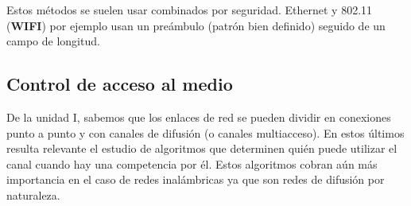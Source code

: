 \documentclass{book}
\begin{document}
	Estos métodos se suelen usar combinados por seguridad. Ethernet y 802.11 (\textbf{WIFI}) por ejemplo usan un preámbulo (patrón bien definido) seguido de un campo de longitud.
	
	\subsection{Control de acceso al medio}
	De la unidad I, sabemos que los enlaces de red se pueden dividir en conexiones punto a punto y con canales de difusión (o canales multiacceso). En estos últimos resulta relevante el estudio de algoritmos que determinen quién puede utilizar el canal cuando hay una competencia por él. Estos algoritmos cobran aún más importancia en el caso de redes inalámbricas ya que son redes de difusión por naturaleza.
	
\end{document}
